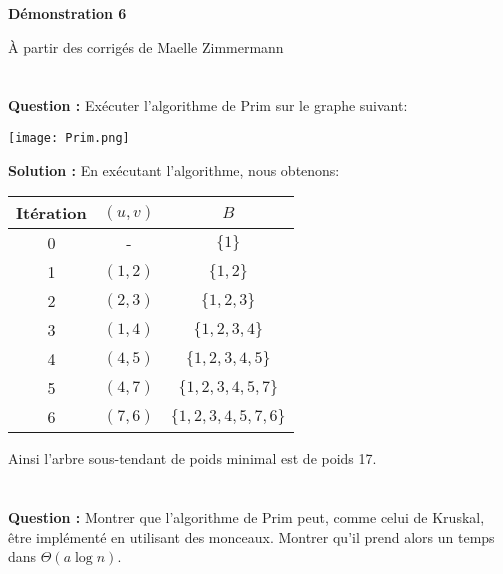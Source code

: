 \documentclass[11pt]{article} %
\newenvironment{question}[1][\unskip]{%
	\par
	\noindent
	\textbf{Question #1:}
	\noindent}
{\medskip}
\newenvironment{solution}[1][\unskip]{%
	\par
	\noindent
	\textbf{Solution #1:}
	\noindent}
{\medskip}
\begin{document}
		
	
	\noindent \hrulefill
	\centerline{\bfseries Démonstration 6}
	\centerline{À partir des corrigés de Maelle Zimmermann}	
	\noindent \hrulefill
	
	\vspace{1cm}
	
	\section{}
	\begin{question}
		Exécuter l'algorithme de Prim sur le graphe suivant:
		\begin{center}
			\texttt{[image: Prim.png]}
		\end{center}
	\end{question}
	\begin{solution}
		En exécutant l'algorithme, nous obtenons:
		\begin{center}
			\begin{tabular}{c|c|c}
				Itération & $(u,v)$ & $B$ \\
				\hline
				0 & - & $\{1\}$\\
				1 & $(1,2)$ & $\{1,2\}$\\
				2 & $(2,3)$ & $\{1,2,3\}$ \\
				3 & $(1,4)$ & $\{1,2,3,4\}$ \\
				4 & $(4,5)$ & $\{1,2,3,4,5\}$ \\
				5 & $(4,7)$ & $\{1,2,3,4,5,7\}$ \\
				6 & $(7,6)$ & $\{1,2,3,4,5,7,6\}$
			\end{tabular}
		\end{center}
		Ainsi l'arbre sous-tendant de poids minimal est de poids 17.
	\end{solution}
	
	\section{}
	\begin{question}
		Montrer que l'algorithme de Prim peut, comme celui de Kruskal, être implémenté en utilisant des monceaux. Montrer qu'il prend alors un temps dans $\Theta(a \log n)$.
	\end{question}
	
\end{document}
